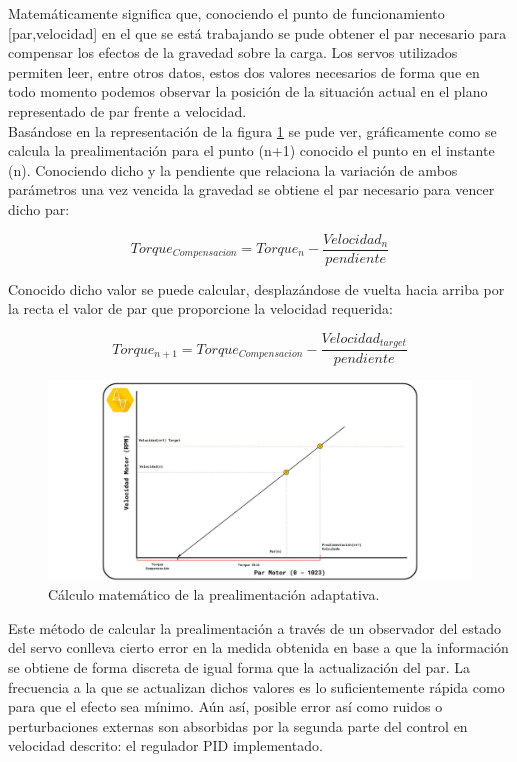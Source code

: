 Matemáticamente significa que, conociendo el punto de funcionamiento [par,velocidad] en el que se está trabajando se pude obtener el par necesario para compensar los efectos de la gravedad sobre la carga. Los servos utilizados permiten leer, entre otros datos, estos dos valores necesarios de forma que en todo momento podemos observar la posición de la situación actual en el plano representado de par frente a velocidad.
\\

Basándose en la representación de la figura \ref{fig:Control:calculo_control} se pude ver, gráficamente como se calcula la prealimentación para el punto (n+1) conocido el punto en el instante (n). Conociendo dicho y la pendiente que relaciona la variación de ambos parámetros una vez vencida la gravedad se obtiene el par necesario para vencer dicho par:

\begin{equation}
    Torque_{Compensacion} =  Torque_n - \frac{Velocidad_{n}}{pendiente}
\end{equation}

Conocido dicho valor se puede calcular, desplazándose de vuelta hacia arriba por la recta el valor de par que proporcione la velocidad requerida:

\begin{equation}
    Torque_{n+1} = Torque_{Compensacion} - \frac{Velocidad_{target}}{pendiente}
\end{equation}

\begin{figure}[H]
    \centering
    \includegraphics[width=1\textwidth]{figuras/Imagenes_Control/calculo_control.jpg}
    \caption{Cálculo matemático de la prealimentación adaptativa.}
    \label{fig:Control:calculo_control}
\end{figure}

Este método de calcular la prealimentación a través de un observador del estado del servo conlleva cierto error en la medida obtenida en base a que la información se obtiene de forma discreta de igual forma que la actualización del par. La frecuencia a la que se actualizan dichos valores es lo suficientemente rápida como para que el efecto sea mínimo. Aún así, posible error así como ruidos o perturbaciones externas son absorbidas por la segunda parte del control en velocidad descrito: el regulador PID implementado.
\\

